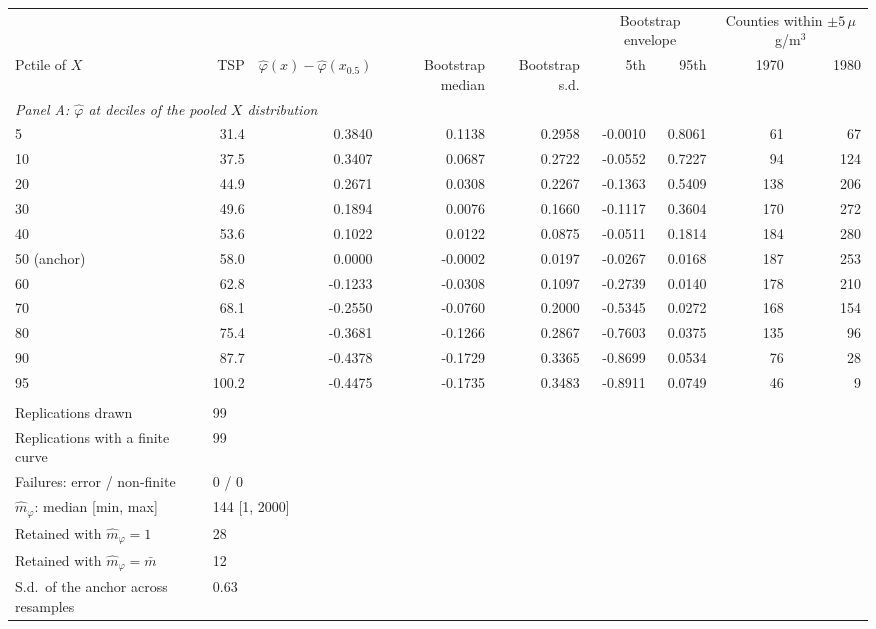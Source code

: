 \begin{tabular}{lrrrrrrrr}
\toprule
& & & & & \multicolumn{2}{c}{Bootstrap envelope} & \multicolumn{2}{c}{Counties within $\pm5\,\mu$g/m$^3$} \\
\cmidrule(lr){6-7} \cmidrule(lr){8-9}
Pctile of $X$ & TSP & $\hat\varphi(x)-\hat\varphi(x_{0.5})$ & Bootstrap median & Bootstrap s.d. & 5th & 95th & 1970 & 1980 \\
\midrule
\multicolumn{9}{l}{\textit{Panel A: $\hat\varphi$ at deciles of the pooled $X$ distribution}} \\
\midrule
5 & 31.4 & 0.3840 & 0.1138 & 0.2958 & -0.0010 & 0.8061 & 61 & 67 \\
10 & 37.5 & 0.3407 & 0.0687 & 0.2722 & -0.0552 & 0.7227 & 94 & 124 \\
20 & 44.9 & 0.2671 & 0.0308 & 0.2267 & -0.1363 & 0.5409 & 138 & 206 \\
30 & 49.6 & 0.1894 & 0.0076 & 0.1660 & -0.1117 & 0.3604 & 170 & 272 \\
40 & 53.6 & 0.1022 & 0.0122 & 0.0875 & -0.0511 & 0.1814 & 184 & 280 \\
50 (anchor) & 58.0 & 0.0000 & -0.0002 & 0.0197 & -0.0267 & 0.0168 & 187 & 253 \\
60 & 62.8 & -0.1233 & -0.0308 & 0.1097 & -0.2739 & 0.0140 & 178 & 210 \\
70 & 68.1 & -0.2550 & -0.0760 & 0.2000 & -0.5345 & 0.0272 & 168 & 154 \\
80 & 75.4 & -0.3681 & -0.1266 & 0.2867 & -0.7603 & 0.0375 & 135 & 96 \\
90 & 87.7 & -0.4378 & -0.1729 & 0.3365 & -0.8699 & 0.0534 & 76 & 28 \\
95 & 100.2 & -0.4475 & -0.1735 & 0.3483 & -0.8911 & 0.0749 & 46 & 9 \\
\addlinespace
\multicolumn{9}{l}{\textit{Panel B: bootstrap design and convergence}} \\
\midrule
Replications drawn & \multicolumn{8}{l}{99} \\
Replications with a finite curve & \multicolumn{8}{l}{99} \\
Failures: error / non-finite & \multicolumn{8}{l}{0 / 0} \\
$\hat m_\varphi$: median [min, max] & \multicolumn{8}{l}{144 [1, 2000]} \\
Retained with $\hat m_\varphi = 1$ & \multicolumn{8}{l}{28} \\
Retained with $\hat m_\varphi = \bar m$ & \multicolumn{8}{l}{12} \\
S.d.\ of the anchor across resamples & \multicolumn{8}{l}{0.63} \\

\end{tabular}
